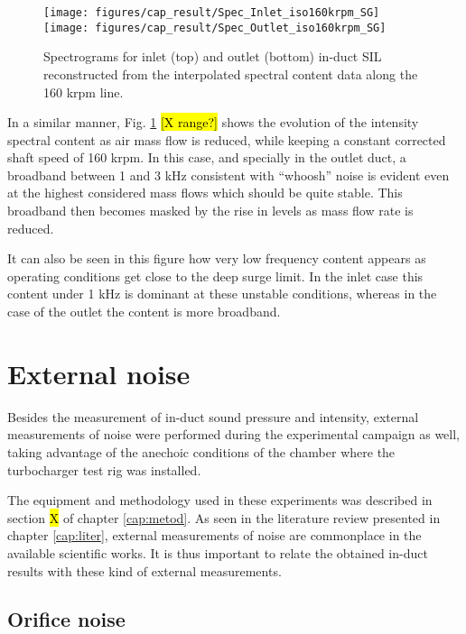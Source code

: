 \begin{figure}[tbh!]
\centering
\texttt{[image: figures/cap\_result/Spec\_Inlet\_iso160krpm\_SG]}\\[5mm]
\texttt{[image: figures/cap\_result/Spec\_Outlet\_iso160krpm\_SG]}
\caption{Spectrograms for inlet (top) and outlet (bottom) in-duct SIL reconstructed from the interpolated spectral content data along the 160 krpm line.}
\label{fig:result_iso160krpm_SG}
\end{figure}

In a similar manner, Fig. \ref{fig:result_iso160krpm_SG} \hl{[X range?]} shows the evolution of the intensity spectral content as air mass flow is reduced, while keeping a constant corrected shaft speed of 160 krpm. In this case, and specially in the outlet duct, a broadband between 1 and 3 kHz consistent with ``whoosh'' noise is evident even at the highest considered mass flows which should be quite stable. This broadband then becomes masked by the rise in levels as mass flow rate is reduced.

It can also be seen in this figure how very low frequency content appears as operating conditions get close to the deep surge limit. In the inlet case this content under 1 kHz is dominant at these unstable conditions, whereas in the case of the outlet the content is more broadband. 

\section{External noise}
\label{sec:external_results}

Besides the measurement of in-duct sound pressure and intensity, external measurements of noise were performed during the experimental campaign as well, taking advantage of the anechoic conditions of the chamber where the turbocharger test rig was installed. 

The equipment and methodology used in these experiments was described in section \hl{X} of chapter \ref{cap:metod}. As seen in the literature review presented in chapter \ref{cap:liter}, external measurements of noise are commonplace in the available scientific works. It is thus important to relate the obtained in-duct results with these kind of external measurements.

\subsection{Orifice noise}

